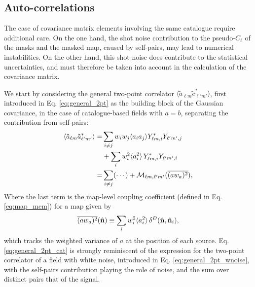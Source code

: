 \documentclass[aps,twocolumn, superscriptaddress, english, nofootinbib, 10pt]{revtex4-2}
\newcommand{\nv}{\hat{\bf n}}
\begin{document}
  \subsection{Auto-correlations}\label{ssec:theo.allsame}
    The case of covariance matrix elements involving the same catalogue require additional care. On the one hand, the shot noise contribution to the pseudo-$C_\ell$ of the masks and the masked map, caused by self-pairs, may lead to numerical instabilities. On the other hand, this shot noise does contribute to the statistical uncertainties, and must therefore be taken into account in the calculation of the covariance matrix.

    We start by considering the general two-point correlator $\langle\tilde{a}_{\ell m}\tilde{c}^*_{\ell'm'}\rangle$, first introduced in Eq. \ref{eq:general_2pt} as the building block of the Gaussian covariance, in the case of catalogue-based fields with $a=b$, separating the contribution from self-pairs:
    \begin{align}\nonumber
      \langle \tilde{a}_{\ell m}\tilde{a}^*_{\ell'm'}\rangle
      =&\sum_{i\neq j}w_iw_j\langle a_ia_j\rangle Y^*_{\ell m,i}Y_{\ell'm',j}\\\nonumber
      &+\sum_i w_i^2\langle a_i^2\rangle\,Y^*_{\ell m,i}Y_{\ell'm',i}\\\label{eq:general_2pt_cat}
      =&\sum_{i\neq j}(\cdots)+{\cal M}_{\ell m,\ell'm'}(\overline{(aw_a)^2}),
    \end{align}
    Where the last term is the map-level coupling coefficient (defined in Eq. \ref{eq:map_mcm}) for a map given by
    \begin{equation}\label{eq:self_var}
      \overline{(aw_a)^2}(\nv)\equiv\sum_i w^2_i\langle a_i^2\rangle\,\delta^D(\nv,\nv_i),
    \end{equation}
    which tracks the weighted variance of $a$ at the position of each source. Eq. \ref{eq:general_2pt_cat} is strongly reminiscent of the expression for the two-point correlator of a field with white noise, introduced in Eq. \ref{eq:general_2pt_wnoise}, with the self-pairs contribution playing the role of noise, and the sum over distinct pairs that of the signal.
\end{document}
